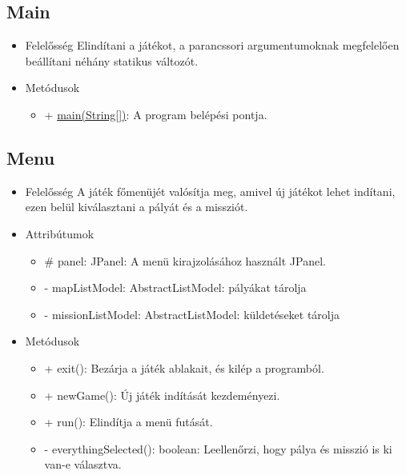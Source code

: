\subsection{Main}
\begin{itemize}
\item Felelősség \newline
Elindítani a játékot, a parancssori argumentumoknak megfelelően beállítani néhány statikus változót.
\item Metódusok
	\begin{itemize}
		\item + \underline{main(String[])}: A program belépési pontja.
	\end{itemize}
\end{itemize}


\subsection{Menu}
\begin{itemize}
\item Felelősség \newline
A játék főmenüjét valósítja meg, amivel új játékot lehet indítani, ezen belül kiválasztani a pályát és a missziót.
\item Attribútumok
	\begin{itemize}
		\item \# panel: JPanel: A menü kirajzolásához használt JPanel.
		\item - mapListModel: AbstractListModel: pályákat tárolja
		\item - missionListModel: AbstractListModel: küldetéseket tárolja
	\end{itemize}
\item Metódusok
	\begin{itemize}
		\item + exit(): Bezárja a játék ablakait, és kilép a programból.
		\item + newGame(): Új játék indítását kezdeményezi.
		\item + run(): Elindítja a menü futását.
		\item - everythingSelected(): boolean: Leellenőrzi, hogy pálya és misszió is ki van-e választva.
	\end{itemize}
\end{itemize}

